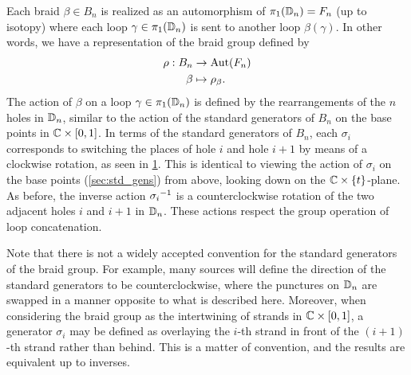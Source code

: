 Each braid $\beta\in B_n$ is realized as an automorphism of $\pi_1(\mathbb{D}_n) = F_n$ (up to isotopy) where each loop $\gamma\in\pi_1(\mathbb{D}_n)$ is sent to another loop $\beta(\gamma)$. In other words, we have a representation of the braid group defined by
\begin{align}
    \begin{split}        
    \rho: B_n &\to \textrm{Aut}\!\left( F_n \right) \\
    \beta &\mapsto \rho_\beta.
    \end{split}
\end{align}
The action of $\beta$ on a loop $\gamma\in\pi_1(\mathbb{D}_n)$ is defined by the rearrangements of the $n$ holes in $\mathbb{D}_n$, similar to the action of the standard generators of $B_n$ on the base points in $\mathbb{C}\times[0,1]$. In terms of the standard generators of $B_n$, each $\sigma_i$ corresponds to switching the places of hole $i$ and hole $i+1$ by means of a clockwise rotation, as seen in \cref{fig:sigma_on_Dn}. This is identical to viewing the action of $\sigma_i$ on the base points (\cref{sec:std_gens}) from above, looking down on the $\mathbb{C}\times\left\{ t \right\}$-plane. As before, the inverse action ${ \sigma_i }^{-1}$ is a counterclockwise rotation of the two adjacent holes $i$ and $i+1$ in $\mathbb{D}_n$. These actions respect the group operation of loop concatenation.

Note that there is not a widely accepted convention for the standard generators of the braid group. For example, many sources will define the direction of the standard generators to be counterclockwise, where the punctures on $\mathbb{D}_n$ are swapped in a manner opposite to what is described here. Moreover, when considering the braid group as the intertwining of strands in $\mathbb{C}\times \left[ 0,1 \right]$, a generator $\sigma_i$ may be defined as overlaying the $i$-th strand in front of the $(i+1)$-th strand rather than behind. This is a matter of convention, and the results are equivalent up to inverses.


\begin{figure}[htbp]
    \centering
    
    \label{fig:sigma_on_Dn}
\end{figure}

